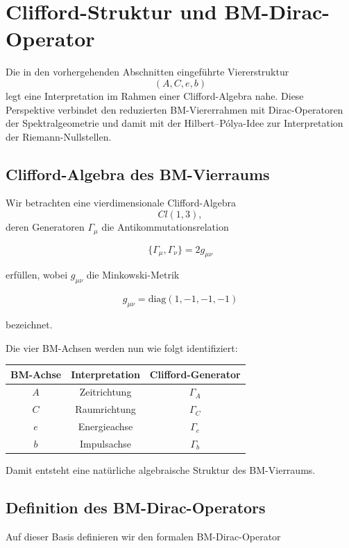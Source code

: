 \documentclass[11pt,a4paper]{article}
\theoremstyle{definition}
\theoremstyle{plain}
\begin{document}
	\section{Clifford-Struktur und BM-Dirac-Operator}
	
	Die in den vorhergehenden Abschnitten eingeführte Viererstruktur
	\[
	(A,C,e,b)
	\]
	legt eine Interpretation im Rahmen einer Clifford-Algebra nahe.
	Diese Perspektive verbindet den reduzierten BM-Viererrahmen mit
	Dirac-Operatoren der Spektralgeometrie und damit mit der
	Hilbert--Pólya-Idee zur Interpretation der Riemann-Nullstellen.
	
	\subsection{Clifford-Algebra des BM-Vierraums}
	
	Wir betrachten eine vierdimensionale Clifford-Algebra
	\[
	Cl(1,3),
	\]
	deren Generatoren $\Gamma_\mu$ die Antikommutationsrelation
	
	\[
	\{\Gamma_\mu,\Gamma_\nu\} = 2 g_{\mu\nu}
	\]
	
	erfüllen, wobei $g_{\mu\nu}$ die Minkowski-Metrik
	
	\[
	g_{\mu\nu} = \mathrm{diag}(1,-1,-1,-1)
	\]
	
	bezeichnet.
	
	Die vier BM-Achsen werden nun wie folgt identifiziert:
	
	\begin{center}
		\begin{tabular}{c c c}
			BM-Achse & Interpretation & Clifford-Generator \\
			\toprule
			$A$ & Zeitrichtung & $\Gamma_A$ \\
			$C$ & Raumrichtung & $\Gamma_C$ \\
			$e$ & Energieachse & $\Gamma_e$ \\
			$b$ & Impulsachse & $\Gamma_b$
		\end{tabular}
	\end{center}
	
	Damit entsteht eine natürliche algebraische Struktur des
	BM-Vierraums.
	
	\subsection{Definition des BM-Dirac-Operators}
	
	Auf dieser Basis definieren wir den formalen BM-Dirac-Operator
	
\end{document}
